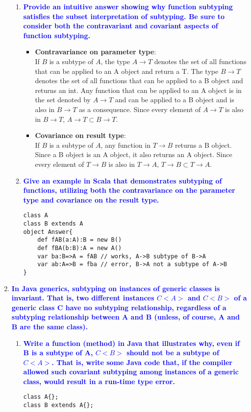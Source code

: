 \documentclass[10pt]{article}
\begin{document}
\begin{enumerate}
\begin{enumerate}
            
        \item \textbf{\textcolor{blue}{Provide an intuitive answer showing why function subtyping satisfies the subset interpretation of subtyping. Be sure to consider both the contravariant and covariant aspects of function subtyping.}}
            \begin{itemize}
                \item \textbf{Contravariance on parameter type}: 
                \\ If $B$ is a subtype of $A$, the type $A \rightarrow T$ denotes the set of all functions that can be applied to an A object and return a T. The type $B \rightarrow T$ denotes the set of all functions that can be applied to a B object and returns an int. Any function that can be applied to an A object is in the set denoted by $A \rightarrow T$ and can be applied to a B object and is also in $B \rightarrow T$ as a consequence. Since every element of $A \rightarrow T$ is also in $B \rightarrow T$, $A \rightarrow T \subset B \rightarrow T$.
                \item \textbf{Covariance on result type}: 
                \\ If $B$ is a subtype of $A$, any function in $T \rightarrow B$ returns a B object. Since a B object is an A object, it also returns an A object. Since every element of $T \rightarrow B$ is also in $T \rightarrow A$, $T \rightarrow B \subset T \rightarrow A$.
            \end{itemize}
        \item \textbf{\textcolor{blue}{Give an example in Scala that demonstrates subtyping of functions, utilizing both the contravariance on the parameter type and covariance on the result type.}}
            \begin{verbatim}
class A
class B extends A
object Answer{
    def fAB(a:A):B = new B()
    def fBA(b:B):A = new A()
    var ba:B=>A = fAB // works, A->B subtype of B->A
    var ab:A=>B = fba // error, B->A not a subtype of A->B
}
            \end{verbatim}
    \end{enumerate}

    \item \textbf{\textcolor{blue}{In Java generics, subtyping on instances of generic classes is invariant. That is, two different instances $C<A>$ and $C<B>$ of a generic class C have no subtyping relationship, regardless of a
    subtyping relationship between A and B (unless, of course, A and B are the same class).}}
    \begin{enumerate}
        \item \textbf{\textcolor{blue}{Write a function (method) in Java that illustrates why, even if B is a subtype of A, $C<B>$ should not be a subtype of $C<A>$. That is, write some Java code that, if the compiler allowed such covariant subtyping among instances of a generic class, would result in a run-time type error.}}
            \begin{verbatim}
class A{};
class B extends A{};


\end{verbatim}
\end{enumerate}
\end{enumerate}
\end{document}

